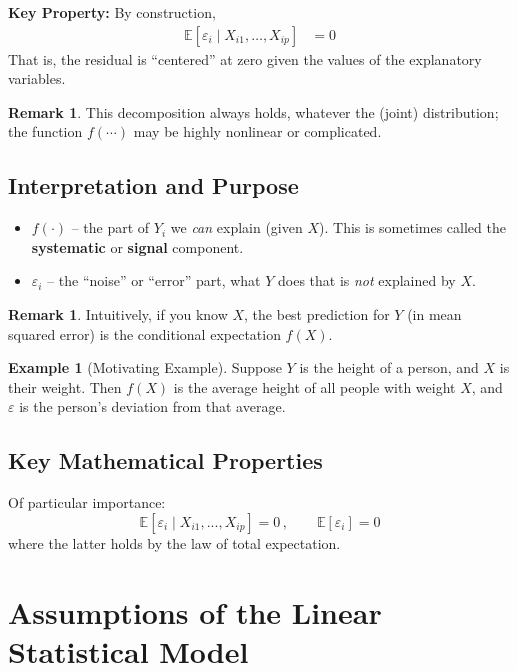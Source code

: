 \documentclass[11pt]{article}
\theoremstyle{definition}
\theoremstyle{plain}
\theoremstyle{definition}
\newtheorem{example}[definition]{Example}
\newtheorem{remark}[definition]{Remark}
\begin{document}
\textbf{Key Property:} By construction,
\begin{align*}
\mathbb{E}[\varepsilon_i \mid X_{i1}, \ldots, X_{ip}] &= 0
\end{align*}
That is, the residual is ``centered'' at zero given the values of the explanatory variables.

\begin{remark}
This decomposition always holds, whatever the (joint) distribution; the function $f(\cdots)$ may be highly nonlinear or complicated.
\end{remark}

\subsection{Interpretation and Purpose}

\begin{itemize}
    \item $f(\cdot)$ -- the part of $Y_i$ we \emph{can} explain (given $X$). This is sometimes called the \textbf{systematic} or \textbf{signal} component.
    \item $\varepsilon_i$ -- the ``noise'' or ``error'' part, what $Y$ does that is \emph{not} explained by $X$.
\end{itemize}

\begin{remark}
Intuitively, if you know $X$, the best prediction for $Y$ (in mean squared error) is the conditional expectation $f(X)$.
\end{remark}

\begin{example}[Motivating Example]
Suppose $Y$ is the height of a person, and $X$ is their weight. Then $f(X)$ is the average height of all people with weight $X$, and $\varepsilon$ is the person's deviation from that average.
\end{example}

\subsection{Key Mathematical Properties}

Of particular importance:
\[
\mathbb{E}[\varepsilon_i \mid X_{i1},...,X_{ip}] = 0\,, \qquad
\mathbb{E}[\varepsilon_i] = 0
\]
where the latter holds by the law of total expectation.

\section{Assumptions of the Linear Statistical Model}
\end{document}
